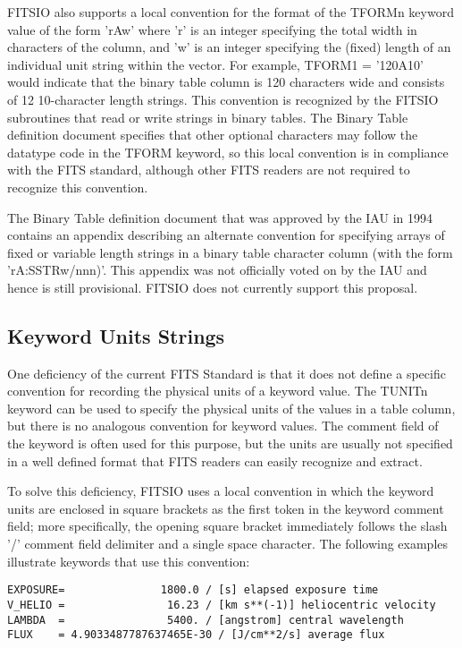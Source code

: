\documentclass[11pt]{book}
\begin{document}
FITSIO also supports a
local convention for the format of the TFORMn keyword value of the form
'rAw' where 'r' is an integer specifying the total width in characters
of the column, and 'w' is an integer specifying the (fixed) length of
an individual unit string within the vector.  For example, TFORM1 =
'120A10' would indicate that the binary table column is 120 characters
wide and consists of 12 10-character length strings.  This convention
is recognized by the FITSIO subroutines that read or write strings in
binary tables.   The Binary Table definition document specifies that
other optional characters may follow the datatype code in the TFORM
keyword, so this local convention is in compliance with the
FITS standard, although other FITS readers are not required to
recognize this convention.

The Binary Table definition document that was approved by the IAU in
1994 contains an appendix describing an alternate convention for
specifying arrays of fixed or variable length strings in a binary table
character column (with the form 'rA:SSTRw/nnn)'.  This appendix was not
officially voted on by the IAU and hence is still provisional.  FITSIO
does not currently support this proposal.


\subsection{Keyword Units Strings}

One deficiency of the current FITS Standard is that it does not define
a specific convention for recording the physical units of a keyword
value.  The TUNITn keyword can be used to specify the physical units of
the values in a table column, but there is no analogous convention for
keyword values.  The comment field of the keyword is often used for
this purpose, but the units are usually not specified in a well defined
format that FITS readers can easily recognize and extract.

To solve this deficiency, FITSIO uses a local convention in which the
keyword units are enclosed in square brackets as the first token in the
keyword comment field; more specifically, the opening square bracket
immediately follows the slash '/' comment field delimiter and a single
space character.  The following examples illustrate keywords that use
this convention:


\begin{verbatim}
EXPOSURE=               1800.0 / [s] elapsed exposure time
V_HELIO =                16.23 / [km s**(-1)] heliocentric velocity
LAMBDA  =                5400. / [angstrom] central wavelength
FLUX    = 4.9033487787637465E-30 / [J/cm**2/s] average flux
\end{verbatim}
\end{document}
